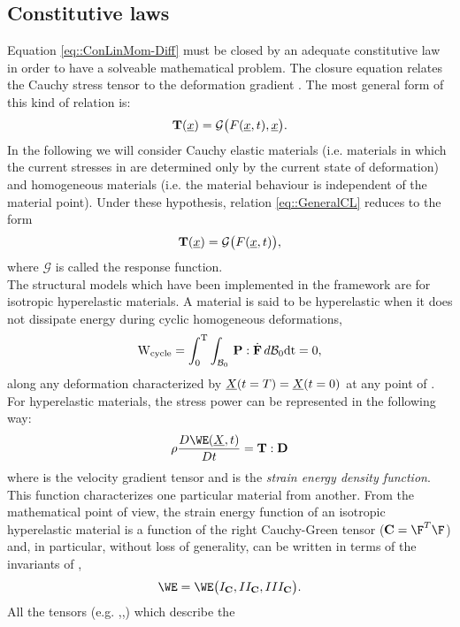 \subsection{Constitutive laws}
\label{sct-Constitutive} Equation \eqref{eq::ConLinMom-Diff} must be
closed by an adequate constitutive law in order to have a solveable
mathematical problem. The closure equation relates the Cauchy stress
tensor \T to the deformation gradient \F. The most general form of
this kind of relation is:
\begin{equation} \textbf{T}(\underline{x})=\mathcal{G}\big(F(\underline{x},t),\underline{x}\big).
  \label{eq::GeneralCL}
\end{equation} In the following we will consider Cauchy elastic
materials (i.e. materials in which the current stresses in \CurCon are
determined only by the current state of deformation) and homogeneous
materials (i.e. the material behaviour is independent of the material
point). Under these hypothesis, relation \eqref{eq::GeneralCL} reduces
to the form
\begin{equation} \textbf{T}(\underline{x})=\mathcal{G}\big(F(\underline{x},t)\big),
  \label{eq::OurRelation}
\end{equation} where $\mathcal{G}$ is called the response function.\\
The structural models which have been implemented in the \SSol
framework are for isotropic hyperelastic materials. A material is said
to be hyperelastic when it does not dissipate energy during cyclic
homogeneous deformations,
\begin{equation} \text{W}_{\text{cycle}} =
\int_{0}^{\text{T}}\int_{\mathcal{B}_0}\,\mathbf{P}:\dot{\mathbf{F}}\,d\mathcal{B}_0\text{dt}
= 0,
  \label{eq::energyDiss}
\end{equation} along any deformation characterized by
$\underline{X}(t=T)=\underline{X}(t=0)$ at any point of \RefCon. For hyperelastic
materials, the stress power can be represented in the following way:
\begin{equation} \rho\frac{D\WE(\posE,t)}{Dt}=\T:\D
  \label{eq::HyperSP}
\end{equation} where \D is the velocity gradient tensor and \W is the
\textit{strain energy density function}. This function characterizes
one particular material from another. From the mathematical point of
view, the strain energy function of an isotropic hyperelastic material
is a function of the right Cauchy-Green tensor ($\C=\F^{T}\F$) and, in
particular, without loss of generality, \W can be written in terms of
the invariants of \C,
\begin{equation} \WE=\WE\big(I_{\C},II_{\C},III_{\C}\big).
  \label{eq::WandInvariants}
\end{equation} All the tensors (e.g. \F,\T,\Piola) which describe the

